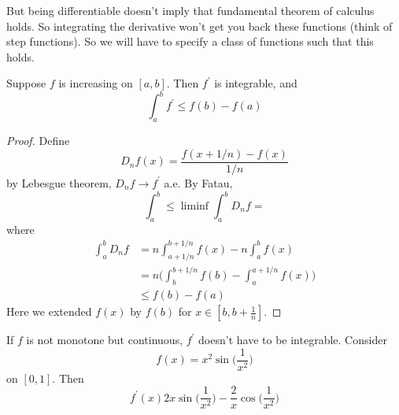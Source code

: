   But being differentiable doesn't imply that fundamental theorem of calculus holds. So integrating the derivative won't get you back these functions (think of step functions). So we will have to specify a class of functions such that this holds. 

  \begin{corollary}
    Suppose $f$ is increasing on $[a, b]$. Then $f^\prime$ is integrable, and 
    \begin{equation}
      \int_a^b f^\prime \leq f(b) - f(a)
    \end{equation}
  \end{corollary}
  \begin{proof}
    Define 
    \begin{equation}
      D_n f(x) = \frac{f(x + 1/n) - f(x)}{1/n}
    \end{equation}
    by Lebesgue theorem, $D_n f \to f^\prime$ a.e. By Fatau, 
    \begin{equation}
      \int_a^b \leq \liminf \int_a^b D_n f = 
    \end{equation}
    where 
    \begin{align}
      \int_a^b D_n f & = n \int_{a + 1/n}^{b + 1/n} f(x) - n \int_a^b f(x) \\
                     & = n \bigg( \int_b^{b + 1/n} f(b) - \int_a^{a + 1/n} f(x) \bigg) \\ 
                     & \leq f(b) - f(a)
    \end{align}
    Here we extended $f(x)$ by $f(b)$ for $x \in [b, b + \frac{1}{n}]$. 
  \end{proof}

  \begin{example}
    If $f$ is not monotone but continuous, $f^\prime$ doesn't have to be integrable. Consider 
    \begin{equation}
      f(x) = x^2 \sin \Big( \frac{1}{x^2} \Big)
    \end{equation}
    on $[0, 1]$. Then 
    \begin{equation}
      f^\prime (x) 2 x \sin \Big( \frac{1}{x^2} \Big) - \frac{2}{x} \cos \Big( \frac{1}{x^2} \Big)
    \end{equation}
  \end{example}
